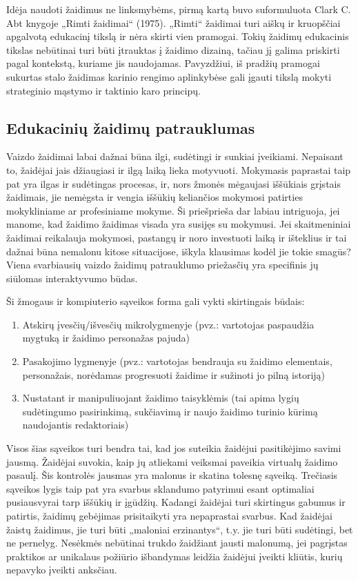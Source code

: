 \documentclass{VUMIFPSkursinis}
\begin{document}
Idėja naudoti žaidimus ne linksmybėms, pirmą kartą buvo suformuluota Clark C. Abt knygoje „Rimti žaidimai“ (1975). „Rimti“ žaidimai turi aiškų ir kruopščiai apgalvotą edukacinį tikslą ir nėra skirti vien pramogai. Tokių žaidimų edukacinis tikslas nebūtinai turi būti įtrauktas į žaidimo dizainą, tačiau jį galima priskirti pagal kontekstą, kuriame jis naudojamas. Pavyzdžiui, iš pradžių pramogai sukurtas stalo žaidimas karinio rengimo aplinkybėse gali įgauti tikslą mokyti strateginio mąstymo ir taktinio karo principų. \cite{abt1987serious}

\subsection{Edukacinių žaidimų patrauklumas}

Vaizdo žaidimai labai dažnai būna ilgi, sudėtingi ir sunkiai įveikiami. Nepaisant to, žaidėjai jais džiaugiasi ir ilgą laiką lieka motyvuoti. Mokymasis paprastai taip pat yra ilgas ir sudėtingas procesas, ir, nors žmonės mėgaujasi iššūkiais grįstais žaidimais, jie nemėgsta ir vengia iššūkių keliančios mokymosi patirties mokykliniame ar profesiniame mokyme. Ši priešprieša dar labiau intriguoja, jei manome, kad žaidimo žaidimas visada yra susijęs su mokymusi. Jei skaitmeniniai žaidimai reikalauja mokymosi, pastangų ir noro investuoti laiką ir išteklius ir tai dažnai būna nemalonu kitose situacijose, iškyla klausimas kodėl jie tokie smagūs? Viena svarbiausių vaizdo žaidimų patrauklumo priežasčių yra specifinis jų siūlomas interaktyvumo būdas.

Ši žmogaus ir kompiuterio sąveikos forma gali vykti skirtingais būdais:
\begin{enumerate}
    \item Atskirų įvesčių/išvesčių mikrolygmenyje (pvz.: vartotojas paspaudžia mygtuką ir žaidimo personažas pajuda)
    \item Pasakojimo lygmenyje (pvz.: vartotojas bendrauja su žaidimo elementais, personažais, norėdamas progresuoti žaidime ir sužinoti jo pilną istoriją)
    \item Nustatant ir manipuliuojant žaidimo taisyklėmis (tai apima lygių sudėtingumo  pasirinkimą, sukčiavimą ir naujo žaidimo turinio kūrimą naudojantis redaktoriais)
\end{enumerate}

Visos šias sąveikos turi bendra tai, kad jos suteikia žaidėjui pasitikėjimo savimi jausmą. Žaidėjai suvokia, kaip jų atliekami veiksmai paveikia virtualų žaidimo pasaulį. Šis kontrolės jausmas yra malonus ir skatina tolesnę sąveiką. Trečiasis sąveikos lygis taip pat yra svarbus sklandumo patyrimui esant optimaliai pusiausvyrai tarp iššūkių ir įgūdžių. Kadangi žaidėjai turi skirtingus gabumus ir patirtis, žaidimų gebėjimas prisitaikyti yra nepaprastai svarbus. Kad žaidėjai žaistų žaidimus, jie turi būti „maloniai erzinantys“, t.y. jie turi būti sudėtingi, bet ne pernelyg. Nesėkmės nebūtinai trukdo žaidžiant jausti malonumą, jei pagrįstas praktikos ar unikalaus požiūrio išbandymas leidžia žaidėjui įveikti kliūtis, kurių nepavyko įveikti anksčiau. \cite{breuer2010so}
\end{document}

